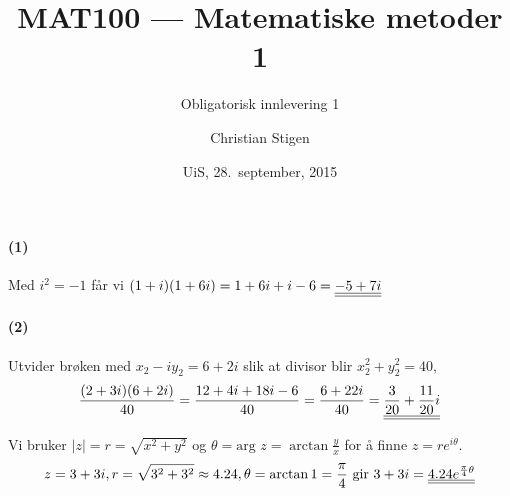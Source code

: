 \documentclass[a4paper,norsk,12pt]{article}
\title{MAT100 --- Matematiske metoder 1}
\subtitle{Obligatorisk innlevering 1}
\author{Christian Stigen}
\date{UiS, 28.~september, 2015}
\begin{document}
\maketitle


\paragraph{(1)}
Med $i^2 = -1$ får vi
\begin{math}
  (1+i)(1+6i) = 1+6i+i-6 = {\underline{\underline{-5+7i}}}
\end{math}

\paragraph{(2)}
Utvider brøken med $x_2 - iy_2 = 6 + 2i$ slik at divisor blir $x_2^2 +
y_2^2 = 40$,
\begin{equation*}
  \frac{(2+3i)(6+2i)}{40} = \frac{12+4i+18i-6}{40}
  = \frac{6+22i}{40} = {\underline{\underline{\frac{3}{20} + \frac{11}{20}i}}}
\end{equation*}


Vi bruker $|z| = r = \sqrt{x^2+y^2}$ og $\theta = \text{arg } z =
\arctan\frac{y}{x}$ for å finne $z = re^{i\theta}$.
\begin{equation*}
  z = 3+3i, r = \sqrt{3^2+3^2} \approx 4.24, \theta = \arctan{1} =
  \frac{\pi}{4} \text{ gir } 3+3i = {\underline{\underline{4.24e^{\frac{\pi}{4}\theta}}}}
\end{equation*}


\end{document}
